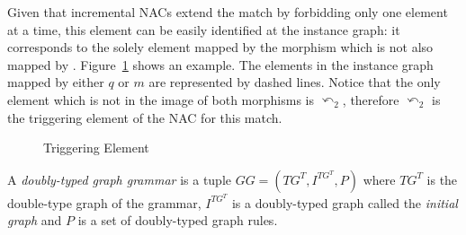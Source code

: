 \begin{example}
  Given that incremental NACs extend the match by forbidding only one element at a time, this element can be easily identified at the instance graph: it corresponds to the solely element mapped by the morphism  which is not also mapped by . Figure~\ref{fig:process:triggering-element} shows an example. The elements in the instance graph mapped by either $q$ or $m$ are represented by dashed lines. Notice that the only element which is not in the image of
  both morphisms is $\curvearrowleft_2$, therefore $\curvearrowleft_2$ is the triggering element of the NAC for this match.
\end{example}

\begin{figure}[!ht]
  \centering
  \caption{Triggering Element}\label{fig:process:triggering-element}
\end{figure}

\begin{definition} A \emph{doubly-typed graph grammar} is a tuple $GG = \left(TG^T, I^{TG^T},P \right)$ where $TG^T$ is the double-type graph of the grammar, $I^{TG^T}$ is a doubly-typed graph called the \emph{initial graph} and $P$ is a set of doubly-typed graph rules.

\end{definition}


